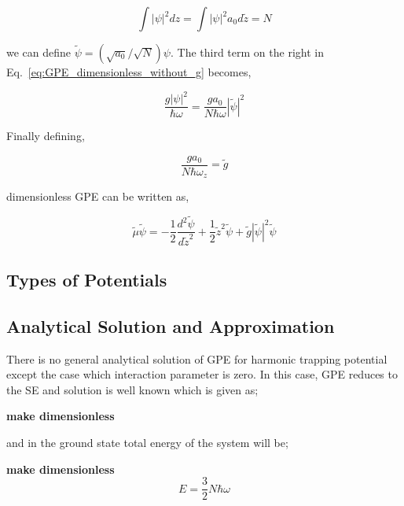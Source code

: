 \documentclass[a4paper,times,12pt]{article}
\begin{document}
\begin{equation}
\int |\psi|^2dz = \int |\psi|^2 a_0 d\widetilde{z} = N
\end{equation}

we can define $\widetilde{\psi} = ({\sqrt{a_0}}/{\sqrt{N}})\psi$. The third term on the right in Eq.~\ref{eq:GPE_dimensionless_without_g} becomes,

\begin{equation}
\label{eq:GPE_dimensionless_g_1}
\frac{g|\psi|^2}{\hbar\omega} = \frac{g a_0}{N\hbar\omega}|\widetilde{\psi}|^2 
\end{equation}

Finally defining,

\begin{equation}
\label{eq:GPE_dimensionless_g_2}
\frac{g a_0}{N\hbar\omega_z} = \widetilde{g}
\end{equation}

dimensionless GPE can be written as,

\begin{equation}
\label{eq:GPE_dimensionless}
\widetilde{\mu} \widetilde{\psi} = -\frac{1}{2}\frac{d^2\widetilde{\psi}}{d\widetilde{z}^2} + \frac{1}{2}\widetilde{z}^2\widetilde{\psi} + \widetilde{g}|\widetilde{\psi}|^2 \widetilde{\psi}
\end{equation}



\subsection{Types of Potentials}


\subsection{Analytical Solution and Approximation}

There is no general analytical solution of GPE for harmonic trapping potential except the case which interaction parameter is zero. In this case, GPE reduces to the SE and solution is well known which is given as;

\textbf{make dimensionless}
\begin{equation}
\label{eq:GPE_SE}
\end{equation}

and in the ground state total energy of the system will be;

\textbf{make dimensionless}
\begin{equation}
\label{eq:GPE_no_inter_GSE}
E = \frac{3}{2}N\hbar\omega
\end{equation}
\end{document}
